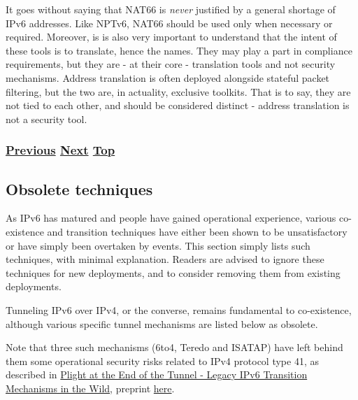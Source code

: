 \documentclass[
]{article}
\begin{document}
It goes without saying that NAT66 is \emph{never} justified by a general
shortage of IPv6 addresses. Like NPTv6, NAT66 should be used only when
necessary or required. Moreover, is is also very important to understand
that the intent of these tools is to translate, hence the names. They
may play a part in compliance requirements, but they are - at their core
- translation tools and not security mechanisms. Address translation is
often deployed alongside stateful packet filtering, but the two are, in
actuality, exclusive toolkits. That is to say, they are not tied to each
other, and should be considered distinct - address translation is not a
security tool.

\subsubsection{\texorpdfstring{\hyperref[tunnels]{Previous}
\hyperref[obsolete-techniques]{Next}
\hyperref[coexistence-with-legacy-ipv4]{Top}}{Previous Next Top}}\label{previous-next-top-18}

\pagebreak

\subsection{Obsolete techniques}\label{obsolete-techniques}

As IPv6 has matured and people have gained operational experience,
various co-existence and transition techniques have either been shown to
be unsatisfactory or have simply been overtaken by events. This section
simply lists such techniques, with minimal explanation. Readers are
advised to ignore these techniques for new deployments, and to consider
removing them from existing deployments.

Tunneling IPv6 over IPv4, or the converse, remains fundamental to
co-existence, although various specific tunnel mechanisms are listed
below as obsolete.

Note that three such mechanisms (6to4, Teredo and ISATAP) have left
behind them some operational security risks related to IPv4 protocol
type 41, as described in
\href{https://doi.org/10.1007/978-3-030-72582-2_23}{Plight at the End of
the Tunnel - Legacy IPv6 Transition Mechanisms in the Wild}, preprint
\href{https://dataplane.org/jtk/publications/kgkp-pam-21.pdf}{here}.
\end{document}
